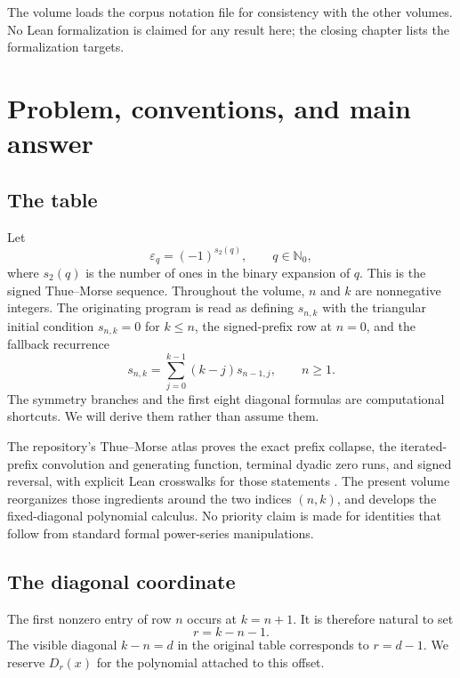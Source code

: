 \documentclass[11pt,a4paper,oneside,openany]{book}
\numberwithin{equation}{chapter}
\theoremstyle{definition}
\theoremstyle{remark}
\newcommand{\Nzero}{\mathbb N_0}
\newcommand{\eps}{\varepsilon}
\newcommand{\wt}{s_2}
\newcommand{\Diag}{D}
\begin{document}
The volume loads the corpus notation file 
for consistency with the other volumes. No Lean formalization is claimed
for any result here; the closing chapter lists the formalization targets.
\begingroup
\small
\tableofcontents
\endgroup

\mainmatter

\chapter{Problem, conventions, and main answer}\label{ch:problem}

\section{The table}

Let
\begin{equation}
  \eps_q=(-1)^{\wt(q)},\qquad q\in\Nzero,
  \label{a:eq:tm-sign}
\end{equation}
where \(\wt(q)\) is the number of ones in the binary expansion of \(q\).
This is the signed Thue--Morse sequence.  Throughout the volume, \(n\) and
\(k\) are nonnegative integers.  The originating program is read as defining
\(s_{n,k}\) with the triangular initial condition \(s_{n,k}=0\) for
\(k\le n\), the signed-prefix row at \(n=0\), and the fallback recurrence
\begin{equation}
  s_{n,k}=\sum_{j=0}^{k-1}(k-j)s_{n-1,j},\qquad n\ge1.
  \label{a:eq:weighted-recurrence}
\end{equation}
The symmetry branches and the first eight diagonal formulas are computational
shortcuts.  We will derive them rather than assume them.

The repository's Thue--Morse atlas proves the exact prefix collapse, the
iterated-prefix convolution and generating function, terminal dyadic zero
runs, and signed reversal, with explicit Lean crosswalks for those statements
\cite{atlas}.  The present volume reorganizes those ingredients around
the two indices \((n,k)\), and develops the fixed-diagonal polynomial calculus.
No priority claim is made for identities that follow from standard formal
power-series manipulations.

\section{The diagonal coordinate}

The first nonzero entry of row \(n\) occurs at \(k=n+1\).  It is therefore
natural to set
\begin{equation}
  r=k-n-1.
  \label{a:eq:r-coordinate}
\end{equation}
The visible diagonal \(k-n=d\) in the original table corresponds to
\(r=d-1\).  We reserve \(\Diag_r(x)\) for the polynomial attached to this
offset.
\end{document}
